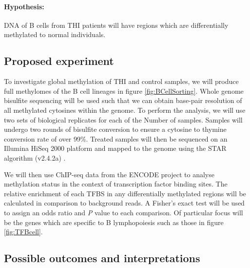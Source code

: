 \documentclass[12pt]{article}
\begin{document}
		\paragraph{Hypothesis:} DNA of B cells from THI patients will have regions which are differentially methylated to normal individuals.
		
		\subsection{Proposed experiment}
		
			To investigate global methylation of THI and control samples, we will produce full methylomes of the B cell lineages in figure \ref{fig:BCellSorting}. 
			Whole genome bisulfite sequencing will be used such that we can obtain base-pair resolution of all methylated cytosines within the genome. 
			To perform the analysis, we will use two sets of biological replicates for each of the {\Huge Number} of samples. 
			Samples will undergo two rounds of bisulfite conversion to ensure a cytosine to thymine conversion rate of over 99\%.
			Treated samples will then be sequenced on an Illumina HiSeq 2000 platform and mapped to the genome using the STAR algorithm (v2.4.2a) \citep{Dobin13}.
			
			We will then use ChIP-seq data from the ENCODE project \citep{ENCODE-Project-Consortium12} to analyse methylation status in the context of transcription factor binding sites.
			The relative enrichment of each TFBS in any differentially methylated regions will be calculated in comparison to background reads. 
			A Fisher's exact test will be used to assign an odds ratio and \textit{P} value to each comparison. 
			Of particular focus will be the genes which are specific to B lymphopoiesis such as those in figure \ref{fig:TFBcell}.

		\subsection{Possible outcomes and interpretations}
		
\end{document}
